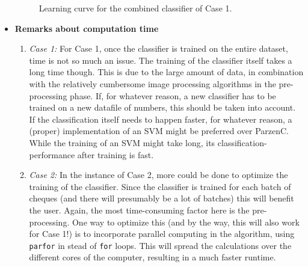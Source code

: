 \begin{itemize}
\begin{figure}[H]
	\caption{Learning curve for the combined classifier of Case 1.}
	\label{fig:learning}
\end{figure}
	\item \textbf{Remarks about computation time}
	\begin{enumerate}
		\item \textit{Case 1:} For Case 1, once the classifier is trained on the entire dataset, time is not so much an issue. The training of the classifier itself takes a long time though. This is due to the large amount of data, in combination with the relatively cumbersome image processing algorithms in the pre-processing phase. If, for whatever reason, a new classifier has to be trained on a new datafile of numbers, this should be taken into account. \\
		If the classification itself needs to happen faster, for whatever reason, a (proper) implementation of an SVM might be preferred over ParzenC. While the training of an SVM might take long, its classification-performance after training is fast.
		\item \textit{Case 2:} In the instance of Case 2, more could be done to optimize the training of the classifier. Since the classifier is trained for each batch of cheques (and there will presumably be a lot of batches) this will benefit the user. Again, the most time-consuming factor here is the pre-processing. One way to optimize this (and by the way, this will also work for Case 1!) is to incorporate parallel computing in the algorithm, using \texttt{parfor} in stead of \texttt{for} loops. This will spread the calculations over the different cores of the computer, resulting in a much faster runtime.
	\end{enumerate}
\end{itemize}